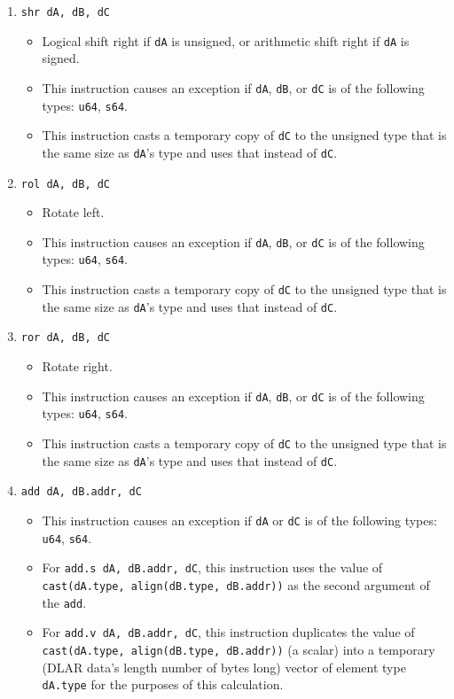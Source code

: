 \documentclass{article}
\begin{document}
\begin{itemize}
\begin{enumerate}
			\item \texttt{shr dA, dB, dC}
				\begin{itemize}
				\item Logical shift right if \texttt{dA} is unsigned, or
					arithmetic shift right if \texttt{dA} is signed.
				\item This instruction causes an exception if \texttt{dA},
					\texttt{dB}, or \texttt{dC} is of the following types:
					\texttt{u64}, \texttt{s64}.
				\item This instruction casts a temporary copy of
					\texttt{dC} to the unsigned type that is the same size
					as \texttt{dA}'s type and uses that instead of
					\texttt{dC}.
				\end{itemize}
			\item \texttt{rol dA, dB, dC}
				\begin{itemize}
				\item Rotate left.
				\item This instruction causes an exception if \texttt{dA},
					\texttt{dB}, or \texttt{dC} is of the following types:
					\texttt{u64}, \texttt{s64}.
				\item This instruction casts a temporary copy of
					\texttt{dC} to the unsigned type that is the same size
					as \texttt{dA}'s type and uses that instead of
					\texttt{dC}.
				\end{itemize}
			\item \texttt{ror dA, dB, dC}
				\begin{itemize}
				\item Rotate right.
				\item This instruction causes an exception if \texttt{dA},
					\texttt{dB}, or \texttt{dC} is of the following types:
					\texttt{u64}, \texttt{s64}.
				\item This instruction casts a temporary copy of
					\texttt{dC} to the unsigned type that is the same size
					as \texttt{dA}'s type and uses that instead of
					\texttt{dC}.
				\end{itemize}
			\item \texttt{add dA, dB.addr, dC}
				\begin{itemize}
				\item This instruction causes an exception if \texttt{dA}
					or \texttt{dC} is of the following types: \texttt{u64},
					\texttt{s64}.
				\item For \texttt{add.s dA, dB.addr, dC}, this instruction
					uses the value of
					\texttt{cast(dA.type, align(dB.type, dB.addr))}
					as the second argument of the \texttt{add}.
				\item For \texttt{add.v dA, dB.addr, dC}, this instruction
					duplicates the value of
					\texttt{cast(dA.type, align(dB.type, dB.addr))}
					(a scalar) into a temporary (DLAR data's length number
					of bytes long) vector of element type \texttt{dA.type}
					for the purposes of this calculation.
				\end{itemize}


\end{enumerate}
\end{itemize}
\end{document}

